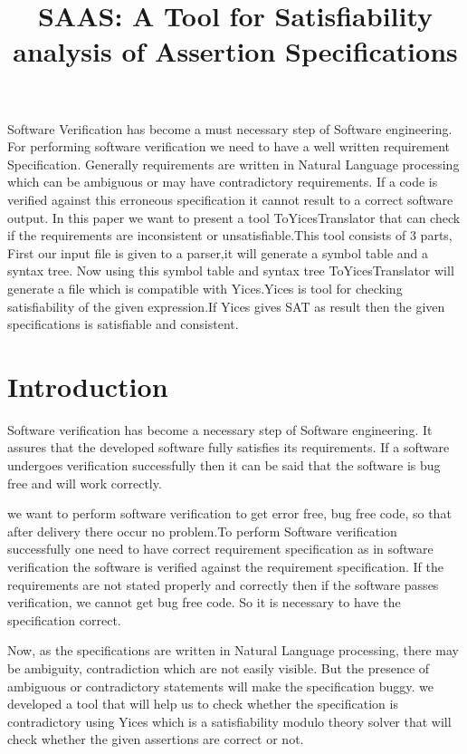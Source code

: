 \documentclass{svmult}
\begin{document}
\title{ SAAS: A Tool for Satisfiability analysis of 
		Assertion Specifications}

\maketitle
\thispagestyle{empty}

\abstract
{
Software Verification has become a must necessary step of Software engineering.
For performing software verification we need to have a well written requirement 
Specification. Generally requirements are written in Natural Language processing
which can be ambiguous or may have contradictory requirements. If a code is verified 
against this erroneous specification it cannot result to a correct software output.
In this paper we want to present a tool ToYicesTranslator  that can check if the 
requirements are inconsistent or unsatisfiable.This tool consists of 3 parts, First 
our input file is given to a parser,it will generate a symbol table and a syntax tree.
Now using this symbol table and syntax tree ToYicesTranslator will generate a file 
which is compatible with Yices.Yices is tool for checking satisfiability of the given 
expression.If Yices gives SAT as result then the given specifications is satisfiable 
and consistent.
}


\section{Introduction}

Software verification has become a necessary step of Software engineering.
It assures that the developed software fully satisfies its requirements. 
If a software undergoes verification successfully then it can be said
that the software is bug free and will work correctly.

we want to perform software verification to get error free, bug free
code, so that after delivery there occur no problem.To perform Software 
verification successfully one need to have correct requirement specification 
as in software verification the software is verified against the requirement 
specification. If the requirements are not stated properly and correctly then 
if the software passes verification, we cannot get bug free code. So it is 
necessary to have the specification correct.

Now, as the specifications are written in Natural Language processing,
there may be ambiguity, contradiction which are not easily visible. But 
the presence of ambiguous or contradictory statements will make the 
specification buggy. we developed a tool that will help us to  check whether
the specification is contradictory using Yices which is  a satisfiability
modulo theory solver that will check whether the given assertions are 
correct or not.  
\end{document}
